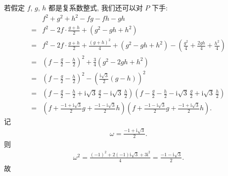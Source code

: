 \begin{example}
    若假定 $f$, $g$, $h$ 都是复系数整式, 我们还可以对 $P$ 下手:
    \begin{align*}
             & f^2 + g^2 + h^2 - fg - fh - gh                                                                                                                                                                                                            \\
        = {} & f^2 - 2f \cdot \frac{g+h}{2} + (g^2 - gh + h^2)                                                                                                                                                                                           \\
        = {} & f^2 - 2f \cdot \frac{g+h}{2} + \frac{(g+h)^2}{4} + (g^2 - gh + h^2) - \left( \frac{g^2}{4} + \frac{2gh}{4} + \frac{h^2}{4} \right)                                                                                                        \\
        = {} & \left( f - \frac{g}{2} - \frac{h}{2} \right)^2 + \frac{3}{4} (g^2 - 2gh + h^2)                                                                                                                                                            \\
        = {} & \left( f - \frac{g}{2} - \frac{h}{2} \right)^2 - \left( \frac{\mathrm{i} \sqrt{3}}{2} (g - h) \right)^2                                                                                                                                   \\
        = {} & \left( f - \frac{g}{2} - \frac{h}{2} + \mathrm{i} \sqrt{3}\, \frac{g}{2} - \mathrm{i} \sqrt{3}\, \frac{h}{2} \right) \left( f - \frac{g}{2} - \frac{h}{2} - \mathrm{i} \sqrt{3}\, \frac{g}{2} + \mathrm{i} \sqrt{3}\, \frac{h}{2} \right) \\
        = {} & \left( f + \frac{-1 + \mathrm{i} \sqrt{3}}{2} g + \frac{-1 - \mathrm{i} \sqrt{3}}{2} h \right) \left( f + \frac{-1 - \mathrm{i} \sqrt{3}}{2} g + \frac{-1 + \mathrm{i} \sqrt{3}}{2} h \right).
    \end{align*}
    记
    \begin{align*}
        \omega = \frac{-1 + \mathrm{i} \sqrt{3}}{2}.
    \end{align*}
    则
    \begin{align*}
        \omega^2 = \frac{(-1)^2 + 2(-1) \mathrm{i} \sqrt{3} + 3\mathrm{i}^2}{4} = \frac{-1 - \mathrm{i} \sqrt{3}}{2}.
    \end{align*}
    故
    \begin{align*}

\end{align*}
\end{example}

